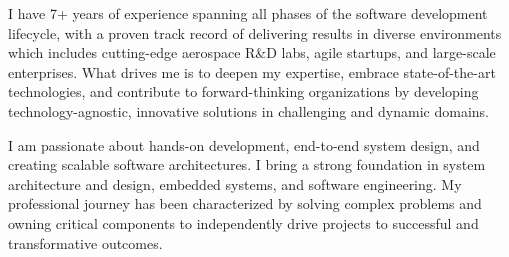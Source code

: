 
\begin{cvparagraph}
\large I have 7+ years of experience spanning all phases of the software development lifecycle, with a proven track record of delivering results in diverse environments which includes cutting-edge aerospace R\&D labs, agile startups, and large-scale enterprises. What drives me is to deepen my expertise, embrace state-of-the-art technologies, and contribute to forward-thinking organizations by developing technology-agnostic, innovative solutions in challenging and dynamic domains.

\large I am passionate about hands-on development, end-to-end system design, and creating scalable software architectures. I bring a strong foundation in system architecture and design, embedded systems, and software engineering. My professional journey has been characterized by solving complex problems and owning critical components to independently drive projects to successful and transformative outcomes.
\end{cvparagraph}
